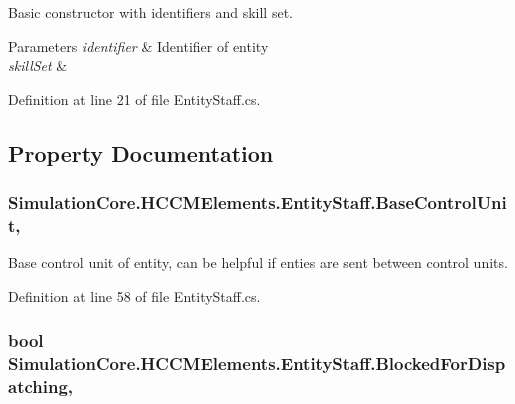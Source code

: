 Basic constructor with identifiers and skill set. 


\begin{DoxyParams}{Parameters}
{\em identifier} & Identifier of entity\\
\hline
{\em skill\+Set} & \\
\hline
\end{DoxyParams}


Definition at line 21 of file Entity\+Staff.\+cs.



\subsection{Property Documentation}
\subsubsection[{\texorpdfstring{Base\+Control\+Unit}{BaseControlUnit}}]{ Simulation\+Core.\+H\+C\+C\+M\+Elements.\+Entity\+Staff.\+Base\+Control\+Unit\hspace{0.3cm}{\ttfamily [get]}, {\ttfamily [set]}}\hypertarget{class_simulation_core_1_1_h_c_c_m_elements_1_1_entity_staff_a29abdc843b6c18f0e59519dfd74fe6c7}{}\label{class_simulation_core_1_1_h_c_c_m_elements_1_1_entity_staff_a29abdc843b6c18f0e59519dfd74fe6c7}


Base control unit of entity, can be helpful if enties are sent between control units. 



Definition at line 58 of file Entity\+Staff.\+cs.

\subsubsection[{\texorpdfstring{Blocked\+For\+Dispatching}{BlockedForDispatching}}]{\setlength{\rightskip}{0pt plus 5cm}bool Simulation\+Core.\+H\+C\+C\+M\+Elements.\+Entity\+Staff.\+Blocked\+For\+Dispatching\hspace{0.3cm}{\ttfamily [get]}, {\ttfamily [set]}}\hypertarget{class_simulation_core_1_1_h_c_c_m_elements_1_1_entity_staff_aca60d68b8ae631a3b9b5bc31420a3edb}{}\label{class_simulation_core_1_1_h_c_c_m_elements_1_1_entity_staff_aca60d68b8ae631a3b9b5bc31420a3edb}


